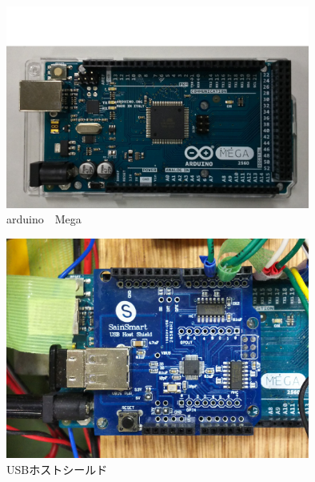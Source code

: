 \begin{figure}[htbp]
  \begin{center}
    \includegraphics[width=100mm]{img/arduinoMega.JPG}
    \end{center}
  \caption{arduino　Mega}
 \label{fig:arduino}
\end{figure}

\begin{figure}[htbp]
  \begin{center}
    \includegraphics[width=100mm]{img/USBhs.JPG}
    \end{center}
  \caption{USBホストシールド}
 \label{fig:USBhs}
\end{figure}

